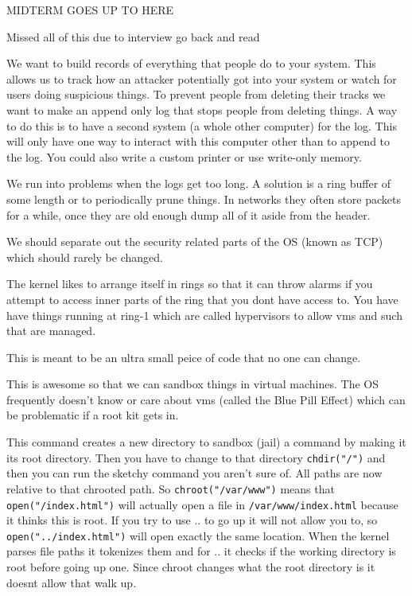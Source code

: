 \documentclass{article}
\begin{document}
MIDTERM GOES UP TO HERE



Missed all of this due to interview go back and read



We want to build records of everything that people do to your system. This allows us to track how an attacker potentially got into your system or watch for users doing suspicious things. To prevent people from deleting their tracks we want to make an append only log that stops people from deleting things. A way to do this is to have a second system (a whole other computer) for the log. This will only have one way to interact with this computer other than to append to the log. You could also write a custom printer or use write-only memory. 

We run into problems when the logs get too long. A solution is a ring buffer of some length or to periodically prune things. In networks they often store packets for a while, once they are old enough dump all of it aside from the header. 



We should separate out the security related parts of the OS (known as TCP) which should rarely be changed. 



The kernel likes to arrange itself in rings so that it can throw alarms if you attempt to access inner parts of the ring that you dont have access to. You have have things running at ring-1 which are called hypervisors to allow vms and such that are managed.


This is meant to be an ultra small peice of code that no one can change.


This is awesome so that we can sandbox things in virtual machines. The OS frequently doesn't know or care about vms (called the Blue Pill Effect) which can be problematic if a root kit gets in.




This command creates a new directory to sandbox (jail) a command by making it its root directory. Then you have to change to that directory \texttt{chdir("/")} and then you can run the sketchy command you aren't sure of. All paths are now relative to that chrooted path. So \texttt{chroot("/var/www")} means that \texttt{open("/index.html")} will actually open a file in \texttt{/var/www/index.html} because it thinks this is root. If you try to use .. to go up it will not allow you to, so \texttt{open("../index.html")} will open exactly the same location. When the kernel parses file paths it tokenizes them and for .. it checks if the working directory is root before going up one. Since chroot changes what the root directory is it doesnt allow that walk up.
\end{document}
